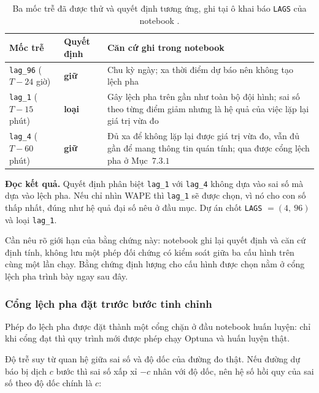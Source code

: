 \begin{table}[htbp]
\centering

\small
\begin{tabular}{@{}L{3.4cm} L{3.6cm} L{7.0cm}@{}}
\toprule
\textbf{Mốc trễ} & \textbf{Quyết định} & \textbf{Căn cứ ghi trong notebook} \\
\midrule
\texttt{lag\_96} ($T-24$ giờ) & \textbf{giữ} &
Chu kỳ ngày; xa thời điểm dự báo nên không tạo lệch pha \\
\addlinespace
\texttt{lag\_1} ($T-15$ phút) & \textbf{loại} &
Gây lệch pha trên gần như toàn bộ đội hình; sai số theo từng điểm giảm nhưng là hệ quả của
việc lặp lại giá trị vừa đo \\
\addlinespace
\texttt{lag\_4} ($T-60$ phút) & \textbf{giữ} &
Đủ xa để không lặp lại được giá trị vừa đo, vẫn đủ gần để mang thông tin quán tính; qua được
cổng lệch pha ở Mục~$7.3.1$ \\
\bottomrule
\end{tabular}
\caption[Ba mốc trễ đã được thử và quyết định tương ứng, ghi tại ô khai báo \texttt{LAGS} của notebook]{Ba mốc trễ đã được thử và quyết định tương ứng, ghi tại ô khai báo \texttt{LAGS} của
notebook .}
\label{tab:chon_lag}
\end{table}

\textbf{Đọc kết quả.} Quyết định phân biệt \texttt{lag\_1} với \texttt{lag\_4} không dựa vào
sai số mà dựa vào lệch pha. Nếu chỉ nhìn WAPE thì \texttt{lag\_1} sẽ được chọn, vì
nó cho con số thấp nhất, đúng như hệ quả đại số nêu ở đầu mục. Dự án chốt \texttt{LAGS}
$= (4,\ 96)$ và loại \texttt{lag\_1}.

Cần nêu rõ giới hạn của bằng chứng này: notebook ghi lại quyết định và căn
cứ định tính, không lưu một phép đối chứng có kiểm soát giữa ba cấu hình trên cùng một lần
chạy. Bằng chứng định lượng cho cấu hình được chọn nằm ở cổng lệch pha trình bày ngay sau
đây.

\subsubsection{Cổng lệch pha đặt trước bước tinh chỉnh}

Phép đo lệch pha được đặt thành một cổng chặn ở đầu notebook huấn luyện: chỉ khi cổng đạt
thì quy trình mới được phép chạy Optuna và huấn luyện thật.

Độ trễ suy từ quan hệ giữa sai số và độ dốc của đường đo thật. Nếu đường dự báo bị dịch
$c$ bước thì sai số xấp xỉ $-c$ nhân với độ dốc, nên hệ số hồi quy của sai số theo độ dốc
chính là $c$:

